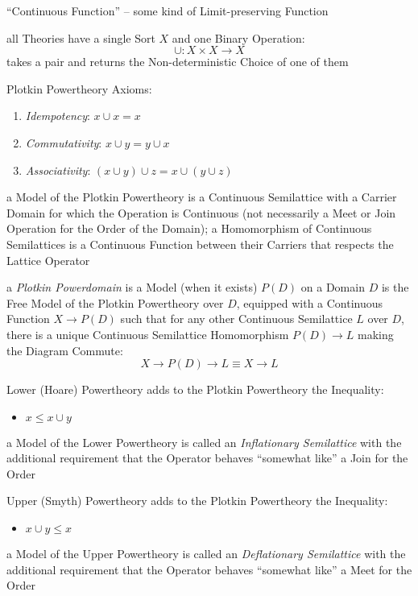 ``Continuous Function'' -- some kind of Limit-preserving Function

all Theories have a single Sort $X$ and one Binary Operation:
\[
  \cup : X \times X \rightarrow X
\]
takes a pair and returns the Non-deterministic Choice of one of them

Plotkin Powertheory Axioms:
\begin{enumerate}
  \item \emph{Idempotency}: $x \cup x = x$
  \item \emph{Commutativity}: $x \cup y = y \cup x$
  \item \emph{Associativity}: $(x \cup y) \cup z = x \cup (y \cup z)$
\end{enumerate}
a Model of the Plotkin Powertheory is a Continuous Semilattice with a
Carrier Domain for which the Operation is Continuous (not necessarily
a Meet or Join Operation for the Order of the Domain); a Homomorphism
of Continuous Semilattices is a Continuous Function between their
Carriers that respects the Lattice Operator

a \emph{Plotkin Powerdomain} is a Model (when it exists) $P(D)$ on a
Domain $D$ is the Free Model of the Plotkin Powertheory over $D$,
equipped with a Continuous Function $X \rightarrow P(D)$ such that for
any other Continuous Semilattice $L$ over $D$, there is a unique
Continuous Semilattice Homomorphism $P(D) \rightarrow L$ making the
Diagram Commute:
\[
  X \rightarrow P(D) \rightarrow L \equiv X \rightarrow L
\]

Lower (Hoare) Powertheory adds to the Plotkin Powertheory the
Inequality:
\begin{itemize}
  \item $x \leq x \cup y$
\end{itemize}
a Model of the Lower Powertheory is called an \emph{Inflationary
  Semilattice} with the additional requirement that the Operator
behaves ``somewhat like'' a Join for the Order %

Upper (Smyth) Powertheory adds to the Plotkin Powertheory the
Inequality:
\begin{itemize}
  \item $x \cup y \leq x$
\end{itemize}
a Model of the Upper Powertheory is called an \emph{Deflationary
  Semilattice} with the additional requirement that the Operator
behaves ``somewhat like'' a Meet for the Order %


